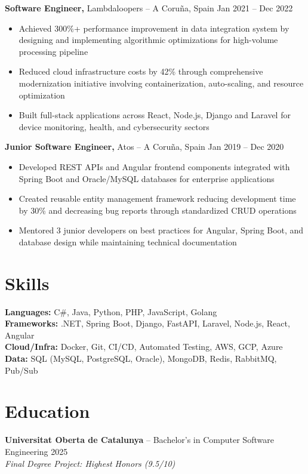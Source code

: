 \documentclass[11pt]{article}       %
\begin{document}
\textbf{Software Engineer,} Lambdaloopers -- A Coruña, Spain \hfill Jan 2021 -- Dec 2022 \\
\vspace{-9pt}
\begin{itemize}
  \item Achieved 300\%+ performance improvement in data integration system by designing and implementing algorithmic optimizations for high-volume processing pipeline
  \item Reduced cloud infrastructure costs by 42\% through comprehensive modernization initiative involving containerization, auto-scaling, and resource optimization
  \item Built full-stack applications across React, Node.js, Django and Laravel for device monitoring, health, and cybersecurity sectors
\end{itemize}

\textbf{Junior Software Engineer,} Atos -- A Coruña, Spain \hfill Jan 2019 -- Dec 2020 \\
\vspace{-9pt}
\begin{itemize}
  \item Developed REST APIs and Angular frontend components integrated with Spring Boot and Oracle/MySQL databases for enterprise applications
  \item Created reusable entity management framework reducing development time by 30\% and decreasing bug reports through standardized CRUD operations
  \item Mentored 3 junior developers on best practices for Angular, Spring Boot, and database design while maintaining technical documentation
\end{itemize}

\vspace{-18.5pt}

\section*{Skills}
\textbf{Languages:} C\#, Java, Python, PHP, JavaScript, Golang \\
\textbf{Frameworks:} .NET, Spring Boot, Django, FastAPI, Laravel, Node.js, React, Angular \\
\textbf{Cloud/Infra:} Docker, Git, CI/CD, Automated Testing, AWS, GCP, Azure \\
\textbf{Data:} SQL (MySQL, PostgreSQL, Oracle), MongoDB, Redis, RabbitMQ, Pub/Sub

\vspace{-6.5pt}

\section*{Education}
\textbf{Universitat Oberta de Catalunya} -- Bachelor's in Computer Software Engineering  \hfill 2025 \\
\textit{Final Degree Project: Highest Honors (9.5/10)}
\end{document}
